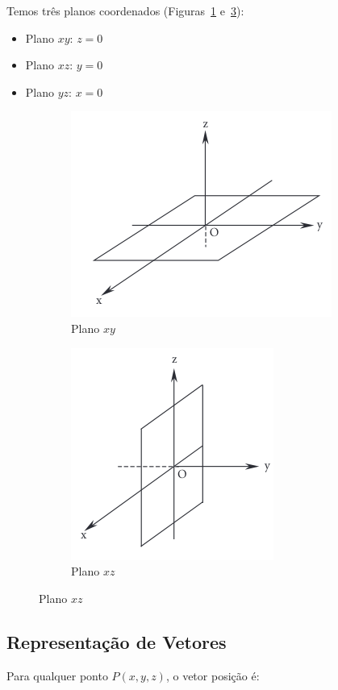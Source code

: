 Temos três planos coordenados (Figuras~\ref{fig:fig1.54a} e~\ref{fig:fig1.54b}):

\begin{itemize}
  \item Plano $xy$: $z=0$
  \item Plano $xz$: $y=0$
  \item Plano $yz$: $x=0$
\end{itemize}

\begin{figure}[H]
  \centering
  \begin{subfigure}
    \centering
    \includegraphics[width=0.5\linewidth]{./fig/fig1.54a.png}
    \caption{Plano $xy$}
    \label{fig:fig1.54a}
  \end{subfigure}
  \hfill
  \centering
  \begin{subfigure}
    \centering
    \includegraphics[width=0.5\linewidth]{./fig/fig1.54b.png}
    \caption{Plano $xz$}
    \label{fig:fig1.54b}
  \end{subfigure}
\end{figure}

\subsection{Representação de Vetores}

Para qualquer ponto $P(x,y,z)$, o vetor posição é:

